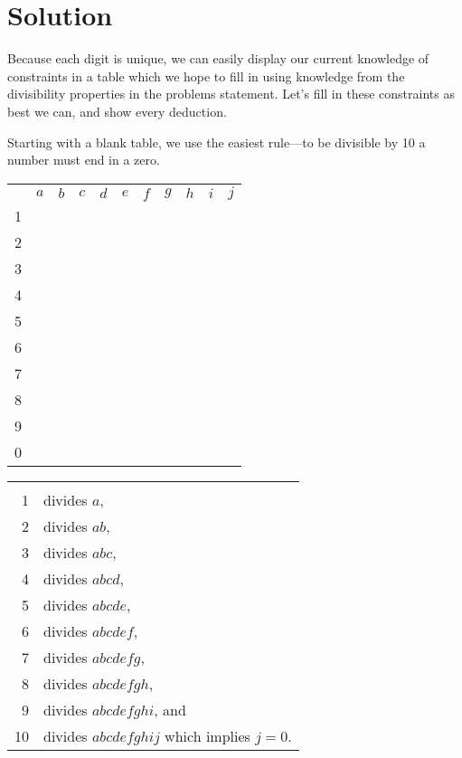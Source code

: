 \section{Solution}

Because each digit is unique, we can easily display our current knowledge of constraints in a table which we hope to fill in using knowledge from the divisibility properties in the problems statement.
Let's fill in these constraints as best we can, and show every deduction.

Starting with a blank table, we use the easiest rule---to be divisible by 10 a number must end in a zero.
\begin{center}
\begin{tabular}{ccccccccccc}
			&	$a$	&	$b$	&	$c$	&	$d$	&	$e$	&	$f$	&	$g$	&	$h$	&	$i$	&	$j$	\\
	1		&		&		&		&		&		&		&		&		&		&		\\
	2		&		&		&		&		&		&		&		&		&		&		\\
	3		&		&		&		&		&		&		&		&		&		&		\\
	4		&		&		&		&		&		&		&		&		&		&		\\
	5		&		&		&		&		&		&		&		&		&		&		\\
	6		&		&		&		&		&		&		&		&		&		&		\\
	7		&		&		&		&		&		&		&		&		&		&		\\
	8		&		&		&		&		&		&		&		&		&		&		\\
	9		&		&		&		&		&		&		&		&		&		&		\\
	0		&		&		&		&		&		&		&		&		&		&		\\
\end{tabular}
\hspace{1cm}\vline\hspace{1cm}
\begin{tabular}{rl}
	& \\
	1	&	divides $a$,					\\
	2	&	divides $ab$,					\\
	3	&	divides $abc$,					\\
	4	&	divides $abcd$,					\\
	5	&	divides $abcde$,				\\
	6	&	divides $abcdef$,				\\
	7	&	divides $abcdefg$,				\\
	8	&	divides $abcdefgh$,				\\
	9	&	divides $abcdefghi$, and		\\
	10	&	divides $abcdefghij$ which implies $j=0$.			
\end{tabular}
\end{center}


